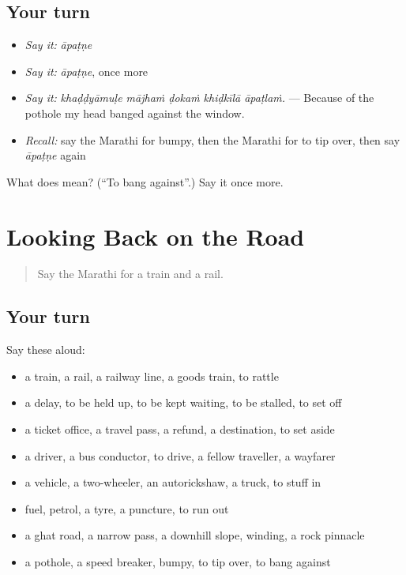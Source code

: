 \subsection*{Your turn}
\begin{itemize}
\raggedright
  \item \emph{Say it:} \emph{āpaṭṇe}
  \item \emph{Say it:} \emph{āpaṭṇe}, once more
  \item \emph{Say it:} \emph{khaḍḍyāmuḷe mājhaṁ ḍokaṁ khiḍkīlā āpaṭlaṁ.} — Because of the pothole my head banged against the window.
  \item \emph{Recall:} say the Marathi for bumpy, then the Marathi for to tip over, then say \emph{āpaṭṇe} again
\end{itemize}

\begin{tcolorbox}[breakable,colback=teal!4,colframe=teal!35!black,title={Before you move on}]
What does  mean? (\textquotedblleft{}To bang against\textquotedblright{}.) Say it once more.
\end{tcolorbox}
\section[(dialogue)]{Looking Back on the Road}

\label{lesson:MR-R403-review-396-403}



\begin{quote}
Say the Marathi for a train and a rail.
\end{quote}

\subsection*{Your turn}
Say these aloud:

\begin{itemize}
\raggedright
  \item a train, a rail, a railway line, a goods train, to rattle
  \item a delay, to be held up, to be kept waiting, to be stalled, to set off
  \item a ticket office, a travel pass, a refund, a destination, to set aside
  \item a driver, a bus conductor, to drive, a fellow traveller, a wayfarer
  \item a vehicle, a two-wheeler, an autorickshaw, a truck, to stuff in
  \item fuel, petrol, a tyre, a puncture, to run out
  \item a ghat road, a narrow pass, a downhill slope, winding, a rock pinnacle
  \item a pothole, a speed breaker, bumpy, to tip over, to bang against
\end{itemize}

